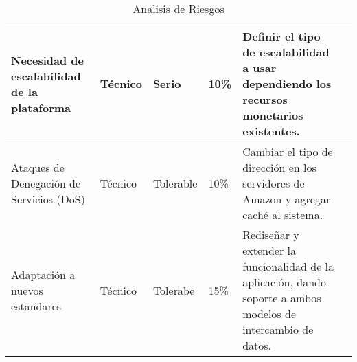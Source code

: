 \begin{table}[b!]
\begin{tabular}{|p{3cm}|lllll}
        \hline
          \multicolumn{1}{|p{3cm}|}{Necesidad de escalabilidad de la plataforma} & 
          \multicolumn{1}{p{2cm}|}{Técnico} & 
          \multicolumn{1}{p{2cm}|}{Serio} & 
          \multicolumn{1}{p{2cm}|}{10\%} & 
          \multicolumn{1}{p{5cm}|}{Definir el tipo de escalabilidad a usar dependiendo los recursos monetarios existentes.} \\ 
        \hline
          \multicolumn{1}{|p{3cm}|}{Ataques de Denegación de Servicios (DoS)} & 
          \multicolumn{1}{p{2cm}|}{Técnico} & 
          \multicolumn{1}{p{2cm}|}{Tolerable} & 
          \multicolumn{1}{p{2cm}|}{10\%} & 
          \multicolumn{1}{p{5cm}|}{Cambiar el tipo de dirección en los servidores de Amazon y agregar caché al sistema.} \\ 
        \hline
          \multicolumn{1}{|p{3cm}|}{Adaptación a nuevos estandares} &
          \multicolumn{1}{p{2cm}|}{Técnico} &
          \multicolumn{1}{p{2cm}|}{Tolerabe} &
          \multicolumn{1}{p{2cm}|}{15\%} &
          \multicolumn{1}{p{5cm}|}{Rediseñar y extender la funcionalidad de la aplicación, dando soporte a ambos modelos de intercambio de datos.} \\ 
        \hline
      \end{tabular}
      \caption{Analisis de Riesgos}
      \label{Analisis de riesgos}
    \end{table}
    \clearpage